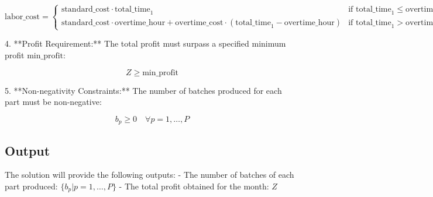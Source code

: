 \documentclass{article}
\begin{document}
   \[
   \text{labor\_cost} = 
   \begin{cases} 
   \text{standard\_cost} \cdot \text{total\_time}_1 & \text{if } \text{total\_time}_1 \leq \text{overtime\_hour} \\
   \text{standard\_cost} \cdot \text{overtime\_hour} + \text{overtime\_cost} \cdot (\text{total\_time}_1 - \text{overtime\_hour}) & \text{if } \text{total\_time}_1 > \text{overtime\_hour} 
   \end{cases}
   \]

4. **Profit Requirement:**
   The total profit must surpass a specified minimum profit \( \text{min\_profit} \):

   \[
   Z \geq \text{min\_profit}
   \]

5. **Non-negativity Constraints:**
   The number of batches produced for each part must be non-negative:

   \[
   b_p \geq 0 \quad \forall p = 1, \ldots, P
   \]

\subsection*{Output}
The solution will provide the following outputs:
- The number of batches of each part produced: \( \{b_p | p = 1, \ldots, P\} \)
- The total profit obtained for the month: \( Z \)
\end{document}
